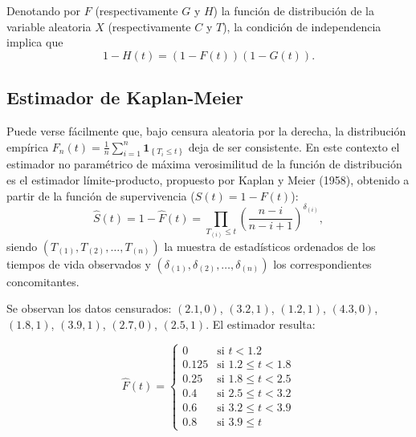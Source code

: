 \documentclass[]{book}
\theoremstyle{break}
\theoremstyle{definition}
\theoremstyle{definition}
\theoremstyle{definition}
\theoremstyle{remark}
\let\BeginKnitrBlock\begin \let\EndKnitrBlock\end
\begin{document}
Denotando por \(F\) (respectivamente \(G\) y \(H\)) la función de
distribución de la variable aleatoria \(X\) (respectivamente \(C\) y
\(T\)), la condición de independencia implica que
\[1-H\left( t \right) =\left( 1-F\left(
t \right) \right) \left( 1-G\left( t \right) \right).\]

\subsection{Estimador de Kaplan-Meier}\label{estimador-de-kaplan-meier}

Puede verse fácilmente que, bajo censura aleatoria por la derecha, la
distribución empírica
\(F_n\left( t \right) =\frac{1}{n} \sum_{i=1}^{n}\mathbf{1}_{\left\{ T_i\leq t\right\} }\)
deja de ser consistente. En este contexto el estimador no paramétrico de
máxima verosimilitud de la función de distribución es el estimador
límite-producto, propuesto por Kaplan y Meier (1958), obtenido a partir
de la función de supervivencia
(\(S\left( t \right) = 1-F\left( t \right)\)):
\[\hat{S}\left( t \right) = 1-\hat{F}\left( t \right) =
\prod_{T_{(i)}\leq t}\left( \frac{n-i}{n-i+1} \right)^{\delta _{(i)}},\]
siendo
\(\left( T_{(1)},T_{\left( 2 \right)},\ldots ,T_{\left( n \right)} \right)\)
la muestra de estadísticos ordenados de los tiempos de vida observados y
\(\left( \delta _{(1)},\delta _{\left(2 \right)}, \ldots ,\delta _{(n)} \right)\)
los correspondientes concomitantes.

\BeginKnitrBlock{example}[Estimación de Kaplan-Meier]
\protect\hypertarget{exm:kaplan-meier}{}{\label{exm:kaplan-meier}
\iffalse (Estimación de Kaplan-Meier) \fi{} } \vspace{0.5cm}

Se observan los datos censurados: \(\left( 2.1,0 \right)\),
\(\left(3.2,1 \right)\), \(\left( 1.2,1 \right)\),
\(\left( 4.3,0 \right)\), \(\left( 1.8,1 \right)\),
\(\left( 3.9,1 \right)\), \(\left( 2.7,0 \right)\),
\(\left( 2.5,1 \right)\). El estimador resulta:

\[\hat{F}\left( t \right) =\left\{ 
\begin{array}{ll}
0& \text{si } t<1.2 \\ 
0.125& \text{si } 1.2\leq t<1.8 \\ 
0.25& \text{si } 1.8\leq t<2.5 \\ 
0.4& \text{si } 2.5\leq t<3.2 \\ 
0.6& \text{si } 3.2\leq t<3.9 \\ 
0.8& \text{si } 3.9\leq t
\end{array}
\right.\]
\EndKnitrBlock{example}
\end{document}
